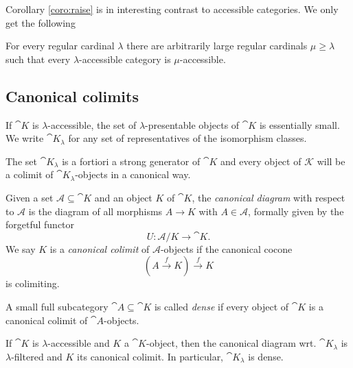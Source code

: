 Corollary \ref{coro:raise} is in interesting contrast to accessible categories. We only get the following
\begin{Proposition}
For every regular cardinal $\lambda$ there are arbitrarily large regular cardinals $\mu \geq \lambda$ such that every $\lambda$-accessible category is $\mu$-accessible.
\end{Proposition}

\subsection{Canonical colimits}
\begin{Definition}
If $\cat K$ is $\lambda$-accessible, the set of $\lambda$-presentable objects of $\cat K$ is essentially small. We write $\cat K_\lambda$ for any set of representatives of the isomorphism classes.
\end{Definition}


The set $\cat K_\lambda$ is a fortiori a strong generator of $\cat K$ and every object of $\mathcal K$ will be a colimit of $\cat K_\lambda$-objects in a canonical way.

\begin{Definition}
Given a set $\mathcal A \subseteq \cat K$ and an object $K$ of $\cat K$, the \emph{canonical diagram} with respect to $\mathcal A$ is the diagram of all morphisms $A \to K$ with $A \in \mathcal A$, formally given by the forgetful functor
\[ U : \mathcal A/K \to \cat K. \]
We say $K$ is a \emph{canonical colimit} of $\mathcal A$-objects if the canonical cocone 
\[ (A \xrightarrow{f} K) \xrightarrow{f} K \]
is colimiting. 
\end{Definition}
\begin{Definition}
A small full subcategory $\cat A \subseteq \cat K$ is called \emph{dense} if every object of $\cat K$ is a canonical colimit of $\cat A$-objects.
\end{Definition}

\begin{Proposition}
If $\cat K$ is $\lambda$-accessible and $K$ a $\cat K$-object, then the canonical diagram wrt. $\cat K_\lambda$ is $\lambda$-filtered and $K$ its canonical colimit. In particular, $\cat K_\lambda$ is dense.
\end{Proposition}